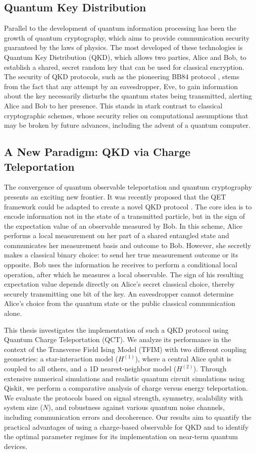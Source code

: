 \subsection{Quantum Key Distribution}
Parallel to the development of quantum information processing has been the growth of quantum cryptography, which aims to provide communication security guaranteed by the laws of physics. The most developed of these technologies is Quantum Key Distribution (QKD), which allows two parties, Alice and Bob, to establish a shared, secret random key that can be used for classical encryption. The security of QKD protocols, such as the pioneering BB84 protocol \cite{Bennett1984}, stems from the fact that any attempt by an eavesdropper, Eve, to gain information about the key necessarily disturbs the quantum states being transmitted, alerting Alice and Bob to her presence. This stands in stark contrast to classical cryptographic schemes, whose security relies on computational assumptions that may be broken by future advances, including the advent of a quantum computer.

\subsection{A New Paradigm: QKD via Charge Teleportation}
The convergence of quantum observable teleportation and quantum cryptography presents an exciting new frontier. It was recently proposed that the QET framework could be adapted to create a novel QKD protocol \cite{QKDbyQET}. The core idea is to encode information not in the state of a transmitted particle, but in the sign of the expectation value of an observable measured by Bob. In this scheme, Alice performs a local measurement on her part of a shared entangled state and communicates her measurement basis and outcome to Bob. However, she secretly makes a classical binary choice: to send her true measurement outcome or its opposite. Bob uses the information he receives to perform a conditional local operation, after which he measures a local observable. The sign of his resulting expectation value depends directly on Alice's secret classical choice, thereby securely transmitting one bit of the key. An eavesdropper cannot determine Alice's choice from the quantum state or the public classical communication alone.

This thesis investigates the implementation of such a QKD protocol using Quantum Charge Teleportation (QCT). We analyze its performance in the context of the Transverse Field Ising Model (TFIM) with two different coupling geometries: a star-interaction model ($H^{(1)}$), where a central Alice qubit is coupled to all others, and a 1D nearest-neighbor model ($H^{(2)}$). Through extensive numerical simulations and realistic quantum circuit simulations using Qiskit, we perform a comparative analysis of charge versus energy teleportation. We evaluate the protocols based on signal strength, symmetry, scalability with system size ($N$), and robustness against various quantum noise channels, including communication errors and decoherence. Our results aim to quantify the practical advantages of using a charge-based observable for QKD and to identify the optimal parameter regimes for its implementation on near-term quantum devices.
